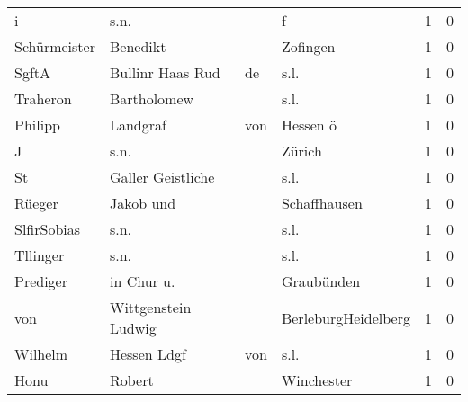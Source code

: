 \begin{tabular}{llllrr}
                        i &                               s.n. &             &                                           f &          1 &         0 \\
             Schürmeister &                           Benedikt &             &                                    Zofingen &          1 &         0 \\
                    SgftA &                   Bullinr Haas Rud &          de &                                        s.l. &          1 &         0 \\
                 Traheron &                        Bartholomew &             &                                        s.l. &          1 &         0 \\
                  Philipp &                           Landgraf &         von &                                    Hessen ö &          1 &         0 \\
                        J &                               s.n. &             &                                      Zürich &          1 &         0 \\
                       St &                  Galler Geistliche &             &                                        s.l. &          1 &         0 \\
                   Rüeger &                          Jakob und &             &                                Schaffhausen &          1 &         0 \\
              SlfirSobias &                               s.n. &             &                                        s.l. &          1 &         0 \\
                 Tllinger &                               s.n. &             &                                        s.l. &          1 &         0 \\
                 Prediger &                         in Chur u. &             &                                  Graubünden &          1 &         0 \\
                      von &                Wittgenstein Ludwig &             &                         BerleburgHeidelberg &          1 &         0 \\
                  Wilhelm &                        Hessen Ldgf &         von &                                        s.l. &          1 &         0 \\
                     Honu &                             Robert &             &                                  Winchester &          1 &         0 \\

\end{tabular}
